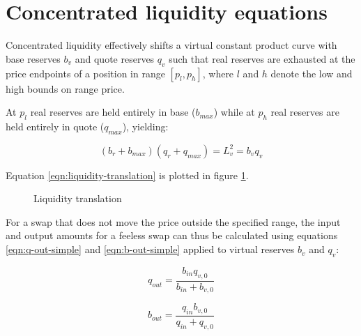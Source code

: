 \documentclass[twocolumn]{article}
\begin{document}
\section{Concentrated liquidity equations}

Concentrated liquidity effectively shifts a virtual constant product curve with base reserves $b_v$
and quote reserves $q_v$ such that real reserves are exhausted at the price endpoints of a position
in range $[p_l, p_h]$, where $l$ and $h$ denote the low and high bounds on range price.

At $p_l$ real reserves are held entirely in base ($b_{max}$) while at $p_h$ real reserves are held
entirely in quote ($q_{max}$), yielding:

\begin{equation} \label{eqn:liquidity-translation}
  (b_r + b_{max})(q_r + q_{max}) = L_v^2 = b_v q_v
\end{equation}

Equation \ref{eqn:liquidity-translation} is plotted in figure \ref{fig:liquidity-translation}.

\begin{figure}[h]
  \centering
  
  \caption{Liquidity translation}
  \label{fig:liquidity-translation}
\end{figure}

For a swap that does not move the price outside the specified range, the input and output amounts
for a feeless swap can thus be calculated using equations \ref{eqn:q-out-simple} and
\ref{eqn:b-out-simple} applied to virtual reserves $b_v$ and $q_v$:

\begin{equation}
  q_{out} = \frac{b_{in} q_{v, 0}}{b_{in} + b_{v, 0}}
\end{equation}

\begin{equation}
  b_{out} = \frac{q_{in} b_{v, 0}}{q_{in} + q_{v, 0}}
\end{equation}
\end{document}
